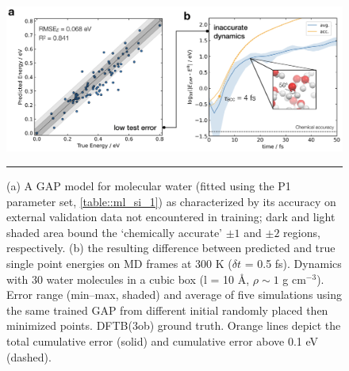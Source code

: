 \documentclass[../../main.tex]{subfiles}
\begin{document}
\begin{figure}[h!]
	\vspace{0.4cm}
	\centering
	\includegraphics[width=\textwidth]{6/gap/figs_si/fig1}
	\vspace{0.2cm}
	\hrule
	\caption{(a) A GAP model for molecular water (fitted using the P1 parameter set, \tablename{ \ref{table::ml_si_1}}) as characterized by its accuracy on external validation data not encountered in training; dark and light shaded area bound the ‘chemically accurate’ $\pm1$ \kcalx and $\pm2$ \kcalx regions, respectively. (b) the resulting difference between predicted and true single point energies on MD frames at 300 K ($\delta t$ = 0.5 fs). Dynamics with 30 water molecules in a cubic box (l = 10 \AA, $\rho \sim 1$ g cm${}^{-3}$). Error range (min–max, shaded) and average of five simulations using the same trained GAP from different initial randomly placed then minimized points. DFTB(3ob) ground truth. Orange lines depict the total cumulative error (solid) and cumulative error above 0.1 eV (dashed).}
	\label{fig::ml_si_1}
\end{figure}
\end{document}
